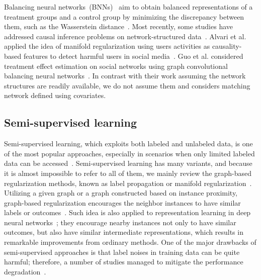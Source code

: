 Balancing neural networks~(BNNs)~\cite{johansson2016learning} aim to obtain balanced representations of a treatment groups and a control group by minimizing the discrepancy between them, such as the Wasserstein distance~\cite{shalit2017estimating}. 
Most recently, some studies have addressed causal inference problems on network-structured data~\cite{guo2020learning,alvari2019less,veitch2019using}.  
Alvari et al. applied the idea of manifold regularization using users activities as causality-based features to detect harmful users in social media~\cite{alvari2019less}. 
Guo et al. considered treatment effect estimation on social networks using graph convolutional balancing neural networks~\cite{guo2020learning}. 
In contrast with their work assuming the network structures are readily available, we do not assume them and considers matching network defined using covariates.


\subsection{Semi-supervised learning}
Semi-supervised learning, which exploits both labeled and unlabeled data, is one of the most popular approaches, especially in scenarios when only limited labeled data can be accessed~\cite{bengio2007greedy,hinton2006fast}.
Semi-supervised learning has many variants, and because it is almost impossible to refer to all of them, we mainly review the graph-based regularization methods, known as label propagation or manifold regularization~\cite{zhu2002learning,belkin2006manifold,weston2012deep}. 
Utilizing a given graph or a graph constructed based on instance proximity, graph-based regularization encourages the neighbor instances to have similar labels or outcomes~\cite{zhu2002learning,belkin2006manifold}. 
Such idea is also applied to representation learning in deep neural networks~\cite{weston2012deep,yang2016revisiting,kipf2016semi,iscen2019label,bui2018neural}; they encourage nearby instances not only to have similar outcomes, but also have similar intermediate representations, which results in remarkable improvements from ordinary methods. 
One of the major drawbacks of semi-supervised approaches is that label noises in training data can be quite harmful; therefore, a number of studies managed to mitigate the performance degradation~\cite{vahdat2017toward,pal2018label,du2018robust,liu2012robust}.

